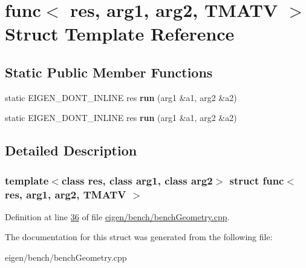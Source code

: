 \hypertarget{structfunc_3_01res_00_01arg1_00_01arg2_00_01_t_m_a_t_v_01_4}{}\section{func$<$ res, arg1, arg2, T\+M\+A\+TV $>$ Struct Template Reference}
\label{structfunc_3_01res_00_01arg1_00_01arg2_00_01_t_m_a_t_v_01_4}
\subsection*{Static Public Member Functions}
\begin{DoxyCompactItemize}
\item 
\mbox{\label{structfunc_3_01res_00_01arg1_00_01arg2_00_01_t_m_a_t_v_01_4_a4b75915389f43a9e926dc1c526bdedf5}} 
static E\+I\+G\+E\+N\+\_\+\+D\+O\+N\+T\+\_\+\+I\+N\+L\+I\+NE res {\bfseries run} (arg1 \&a1, arg2 \&a2)
\item 
\mbox{\label{structfunc_3_01res_00_01arg1_00_01arg2_00_01_t_m_a_t_v_01_4_a4b75915389f43a9e926dc1c526bdedf5}} 
static E\+I\+G\+E\+N\+\_\+\+D\+O\+N\+T\+\_\+\+I\+N\+L\+I\+NE res {\bfseries run} (arg1 \&a1, arg2 \&a2)
\end{DoxyCompactItemize}


\subsection{Detailed Description}
\subsubsection*{template$<$class res, class arg1, class arg2$>$\newline
struct func$<$ res, arg1, arg2, T\+M\+A\+T\+V $>$}



Definition at line \hyperlink{eigen_2bench_2bench_geometry_8cpp_source_l00036}{36} of file \hyperlink{eigen_2bench_2bench_geometry_8cpp_source}{eigen/bench/bench\+Geometry.\+cpp}.



The documentation for this struct was generated from the following file\+:\begin{DoxyCompactItemize}
\item 
eigen/bench/bench\+Geometry.\+cpp\end{DoxyCompactItemize}
